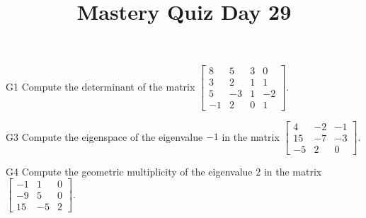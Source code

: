 \documentclass{sbgLAquiz}
\title{Mastery Quiz Day 29 }
\begin{document}
\begin{problem}{G1}
Compute the determinant of the matrix $\begin{bmatrix} 8 & 5 & 3 & 0 \\ 3 & 2 & 1 & 1 \\ 5 & -3 & 1 & -2 \\ -1 & 2 & 0 & 1\end{bmatrix} $.
\end{problem}

\begin{problem}{G3}
Compute the eigenspace of the eigenvalue $-1$ in the matrix $\begin{bmatrix} 4 & -2 & -1 \\ 15 & -7 & -3 \\ -5 & 2 & 0 \end{bmatrix}$.
\end{problem}
\newpage

\begin{problem}{G4}
Compute the geometric multiplicity of the eigenvalue $2$ in the matrix $\begin{bmatrix} -1 & 1 & 0 \\ -9 & 5 & 0 \\ 15 & -5 & 2 \end{bmatrix}$.
\end{problem}
\end{document}
